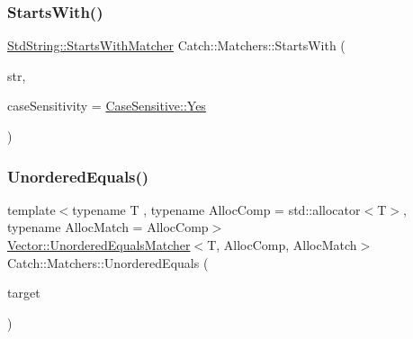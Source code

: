 \mbox{\label{namespace_catch_1_1_matchers_a97c9ee09a70378ca7e8c6f9f01b0d6d1}} 
\subsubsection{\texorpdfstring{Starts\+With()}{StartsWith()}}
{\footnotesize\ttfamily \mbox{\hyperlink{struct_catch_1_1_matchers_1_1_std_string_1_1_starts_with_matcher}{Std\+String\+::\+Starts\+With\+Matcher}} Catch\+::\+Matchers\+::\+Starts\+With (\begin{DoxyParamCaption}\item[{std\+::string const \&}]{str,  }\item[{\mbox{\hyperlink{struct_catch_1_1_case_sensitive_aad49d3aee2d97066642fffa919685c6a}{Case\+Sensitive\+::\+Choice}}}]{case\+Sensitivity = {\ttfamily \mbox{\hyperlink{struct_catch_1_1_case_sensitive_aad49d3aee2d97066642fffa919685c6aa7c5550b69ec3c502e6f609b67f9613c6}{Case\+Sensitive\+::\+Yes}}} }\end{DoxyParamCaption})}

\mbox{\label{namespace_catch_1_1_matchers_aa1955107efa02ee9e0a9f2db9c160f1f}} 
\subsubsection{\texorpdfstring{Unordered\+Equals()}{UnorderedEquals()}}
{\footnotesize\ttfamily template$<$typename T , typename Alloc\+Comp  = std\+::allocator$<$\+T$>$, typename Alloc\+Match  = Alloc\+Comp$>$ \\
\mbox{\hyperlink{struct_catch_1_1_matchers_1_1_vector_1_1_unordered_equals_matcher}{Vector\+::\+Unordered\+Equals\+Matcher}}$<$T, Alloc\+Comp, Alloc\+Match$>$ Catch\+::\+Matchers\+::\+Unordered\+Equals (\begin{DoxyParamCaption}\item[{std\+::vector$<$ T, Alloc\+Comp $>$ const \&}]{target }\end{DoxyParamCaption})}

\mbox{\label{namespace_catch_1_1_matchers_a95520b036d439e75aa9dcbe4ffa20188}} 
